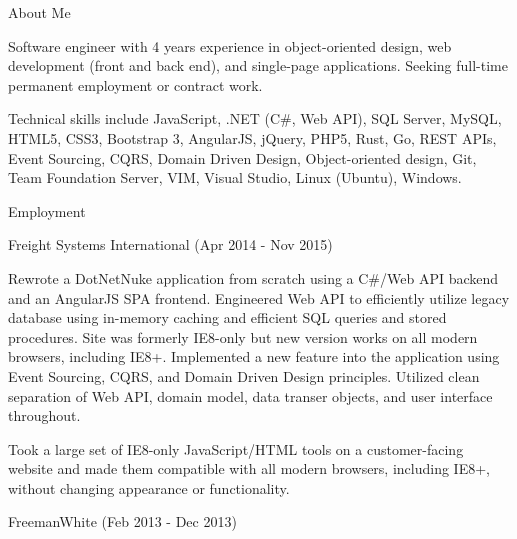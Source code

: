 \documentclass{article}
\begin{document}
    \bigskip\bigskip\bigskip


    {
        \noindent\Large
        About Me
    }

    \noindent\makebox[\linewidth]{\rule{\textwidth}{0.4pt}}
    \medskip

    Software engineer with 4 years experience in object-oriented design, web development (front and back end), and single-page applications. Seeking full-time permanent employment or contract work.

    \medskip

    Technical skills include JavaScript, .NET (C\#, Web API), SQL Server, MySQL, HTML5, CSS3, Bootstrap 3, AngularJS, jQuery, PHP5, Rust, Go, REST APIs, Event Sourcing, CQRS, Domain Driven Design, Object-oriented design, Git, Team Foundation Server, VIM, Visual Studio, Linux (Ubuntu), Windows.

    
    \bigskip\bigskip\bigskip

    {
        \noindent\Large
        Employment
    }

    \noindent\makebox[\linewidth]{\rule{\textwidth}{0.4pt}}
    \medskip

    {
        \large
        Freight Systems International
        {
            \color{fade-gray}
            \small
            (Apr 2014 - Nov 2015)
        }
    }

    \medskip

    Rewrote a DotNetNuke application from scratch using a C\#/Web API backend and an AngularJS SPA frontend. Engineered Web API to efficiently utilize legacy database using in-memory caching and efficient SQL queries and stored procedures. Site was formerly IE8-only but new version works on all modern browsers, including IE8+. Implemented a new feature into the application using Event Sourcing, CQRS, and Domain Driven Design principles. Utilized clean separation of Web API, domain model, data transer objects, and user interface throughout.

    \smallskip

    Took a large set of IE8-only JavaScript/HTML tools on a customer-facing website and made them compatible with all modern browsers, including IE8+, without changing appearance or functionality.


    \bigskip\bigskip

    {
        \large
        FreemanWhite 
        {
            \color{fade-gray}
            \small
            (Feb 2013 - Dec 2013)
        }
    }

    \medskip
\end{document}
